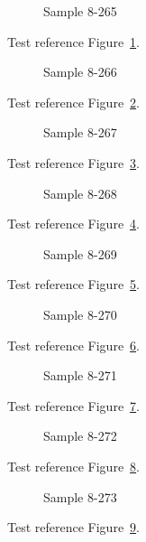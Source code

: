 \begin{figure}[tbhp]
\caption{Sample 8-265}
\label{fig:sample-8-265}
\end{figure}

Test reference Figure~\ref{fig:sample-8-265}.

\begin{figure}[tbhp]
\caption{Sample 8-266}
\label{fig:sample-8-266}
\end{figure}

Test reference Figure~\ref{fig:sample-8-266}.

\begin{figure}[tbhp]
\caption{Sample 8-267}
\label{fig:sample-8-267}
\end{figure}

Test reference Figure~\ref{fig:sample-8-267}.

\begin{figure}[tbhp]
\caption{Sample 8-268}
\label{fig:sample-8-268}
\end{figure}

Test reference Figure~\ref{fig:sample-8-268}.

\begin{figure}[tbhp]
\caption{Sample 8-269}
\label{fig:sample-8-269}
\end{figure}

Test reference Figure~\ref{fig:sample-8-269}.

\begin{figure}[tbhp]
\caption{Sample 8-270}
\label{fig:sample-8-270}
\end{figure}

Test reference Figure~\ref{fig:sample-8-270}.

\begin{figure}[tbhp]
\caption{Sample 8-271}
\label{fig:sample-8-271}
\end{figure}

Test reference Figure~\ref{fig:sample-8-271}.

\begin{figure}[tbhp]
\caption{Sample 8-272}
\label{fig:sample-8-272}
\end{figure}

Test reference Figure~\ref{fig:sample-8-272}.

\begin{figure}[tbhp]
\caption{Sample 8-273}
\label{fig:sample-8-273}
\end{figure}

Test reference Figure~\ref{fig:sample-8-273}.

